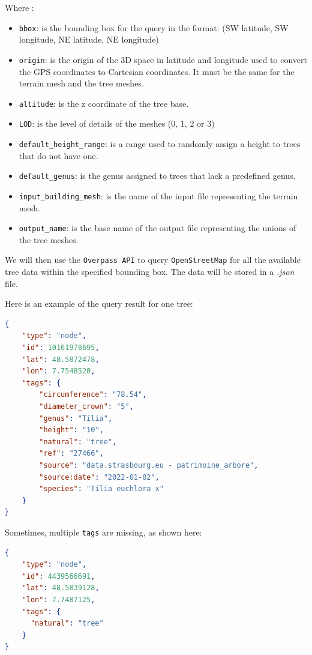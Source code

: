 \documentclass[12pt]{article}
\begin{document}
Where :
\begin{itemize}
    \item \texttt{bbox}: is the bounding box for the query in the format:
    \subitem (SW latitude, SW longitude, NE latitude, NE longitude)
    \item \texttt{origin}: is the origin of the 3D space in latitude and longitude
    used to convert the GPS coordinates to Cartesian coordinates. It must be the
    same for the terrain mesh and the tree meshes.
    \item \texttt{altitude}: is the z coordinate of the tree base.
    \item \texttt{LOD}: is the level of details of the meshes (0, 1, 2 or 3)
    \item \texttt{default\_height\_range}: is a range used to randomly assign a
    height to trees that do not have one.
    \item \texttt{default\_genus}: is the genus assigned to trees that lack a
    predefined genus.
    \item \texttt{input\_building\_mesh}: is the name of the input file
    representing the terrain mesh.
    \item \texttt{output\_name}: is the base name of the output file
    representing the unions of the tree meshes.
\end{itemize}

We will then use the \texttt{Overpass API}\cite{overpass} to query
\texttt{OpenStreetMap} for all the available tree data within the specified
bounding box. The data will be stored in a \textit{.json} file.

Here is an example of the query result for one tree:

\begin{lstlisting}[language=json]
{
    "type": "node",
    "id": 10161978695,
    "lat": 48.5872478,
    "lon": 7.7548520,
    "tags": {
        "circumference": "78.54",
        "diameter_crown": "5",
        "genus": "Tilia",
        "height": "10",
        "natural": "tree",
        "ref": "27466",
        "source": "data.strasbourg.eu - patrimoine_arbore",
        "source:date": "2022-01-02",
        "species": "Tilia euchlora x"
    }
}
\end{lstlisting}

Sometimes, multiple \texttt{tags} are missing, as shown here:

\begin{lstlisting}[language=json]
{
    "type": "node",
    "id": 4439566691,
    "lat": 48.5839128,
    "lon": 7.7487125,
    "tags": {
      "natural": "tree"
    }
}
\end{lstlisting}
\end{document}
